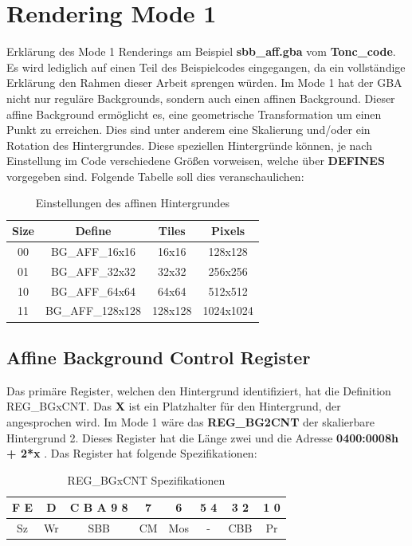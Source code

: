 \chapter{Rendering Mode 1}
Erklärung des Mode 1 Renderings am Beispiel \textbf{sbb\_aff.gba} vom \textbf{Tonc\_code}. Es wird lediglich auf einen Teil des Beispielcodes eingegangen, da ein vollständige Erklärung den Rahmen dieser Arbeit sprengen würden.
Im Mode 1 hat der GBA nicht nur reguläre Backgrounds, sondern auch einen affinen Background. 
Dieser affine Background ermöglicht es, eine geometrische Transformation um einen Punkt zu erreichen. Dies sind unter anderem eine Skalierung und/oder ein Rotation des Hintergrundes. Diese speziellen Hintergründe können, je nach Einstellung im Code verschiedene Größen vorweisen, welche über \textbf{DEFINES} vorgegeben sind. Folgende Tabelle soll dies veranschaulichen:
\begin{table}[ht]
\centering
\begin{tabular}{|c|c|c|c|}
\hline
\textbf{Size} & \textbf{Define} & \textbf{Tiles} & \textbf{Pixels} \\ \hline
00 & BG\_AFF\_16x16 & 16x16 & 128x128 \\ \hline
01 & BG\_AFF\_32x32 & 32x32 & 256x256 \\ \hline
10 & BG\_AFF\_64x64 & 64x64 & 512x512 \\ \hline
11 & BG\_AFF\_128x128 & 128x128 & 1024x1024 \\ \hline
\end{tabular}
\caption{Einstellungen des affinen Hintergrundes}
\label{size}
\end{table}


\section{Affine Background Control Register}
Das primäre Register, welchen den Hintergrund identifiziert, hat die Definition REG\_BGxCNT. Das \textbf{X} ist ein Platzhalter für den Hintergrund, der angesprochen wird. Im Mode 1 wäre das \textbf{REG\_BG2CNT} der skalierbare Hintergrund 2. Dieses Register hat die Länge zwei und die Adresse \textbf{ 0400:0008h + 2*x} . Das Register hat folgende Spezifikationen:
\begin{table}[ht]
\centering
\begin{tabular}{|c|c|c|c|c|c|c|c|}
\hline
\textbf{F E} & \textbf{D} & \textbf{C B A 9 8} & \textbf{7} & \textbf{6} & \textbf{5 4} & \textbf{3 2} & \textbf{1 0} \\ \hline
Sz & Wr & SBB & CM & Mos & - & CBB & Pr \\ \hline
\end{tabular}
\caption{REG\_BGxCNT Spezifikationen}
\label{regspec}
\end{table}

